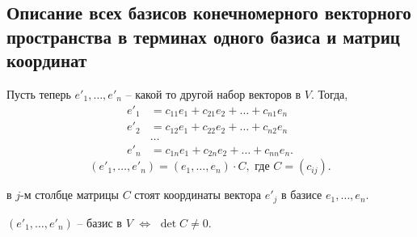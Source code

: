 \subsection{Описание всех базисов конечномерного векторного пространства в терминах одного базиса и матриц координат}

Пусть теперь $e'_1, \dots, e'_n$ -- какой то другой набор векторов в $V$. Тогда,
\begin{align*}
    e'_1 &= c_{11} e_1 + c_{21} e_2 + \dots + c_{n1} e_n \\
    e'_2 &= c_{12} e_1 + c_{22} e_2 + \dots + c_{n2} e_n \\
    &\dots \\
    e'_n &= c_{1n} e_1 + c_{2n} e_2 + \dots + c_{nn} e_n
.\end{align*}
\begin{equation*}
    (e'_1, \dots, e'_n) = (e_1, \dots, e_n) \cdot C, \text{ где } C = (c_{ij})
.\end{equation*}

в $j$-м столбце матрицы $C$ стоят координаты вектора $e'_j$ в базисе $e_1, \dots, e_n$.

\begin{proposal}
    $(e'_1, \dots, e'_n)$ -- базис в $V$ $\iff$ $\det C \neq 0$.
\end{proposal}

